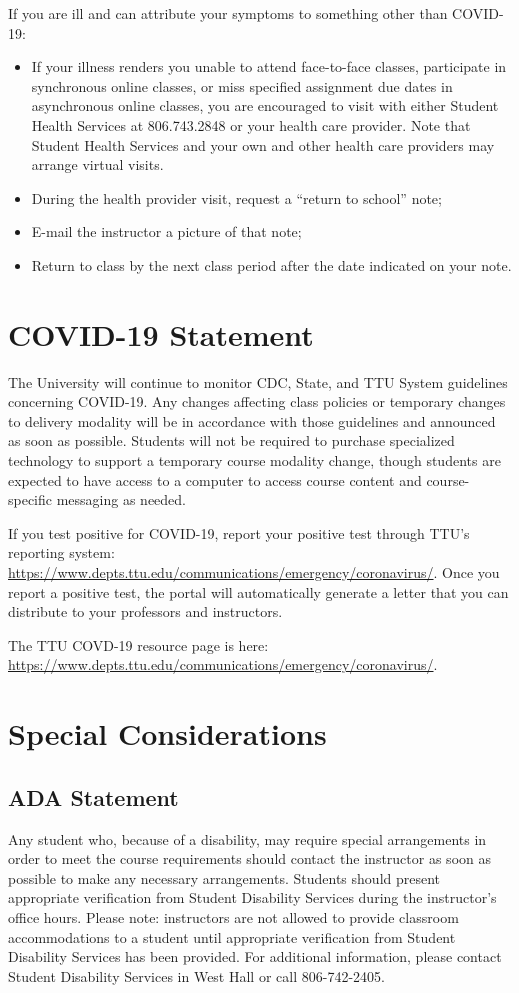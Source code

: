 \documentclass[12pt, notitlepage]{article}   	%
\begin{document}
{If you are ill and can attribute your symptoms to something other than COVID-19:
\begin{itemize}
	\item{If your illness renders you unable to attend face-to-face classes, participate 
	in synchronous online classes, or miss specified assignment due dates in asynchronous 
	online classes, you are encouraged to visit with either Student Health Services at 
	806.743.2848 or your health care provider.  Note that Student Health Services and 
	your own and other health care providers may arrange virtual visits.}
	\item{During the health provider visit, request a “return to school” note;}
	\item{E-mail the instructor a picture of that note;}
	\item{Return to class by the next class period after the date indicated on your note.}
\end{itemize}

\section{COVID-19 Statement}
The University will continue to monitor CDC, State, and TTU System guidelines concerning COVID-19. 
Any changes affecting class policies or temporary changes to delivery modality will be in 
accordance with those guidelines and announced as soon as possible. Students will not be 
required to purchase specialized technology to support a temporary course modality change, 
though students are expected to have access to a computer to access course content and 
course-specific messaging as needed. 

If you test positive for COVID-19, report your positive test through TTU's reporting system: 
\url{https://www.depts.ttu.edu/communications/emergency/coronavirus/}. Once you report a positive 
test, the portal will automatically generate a letter that you can distribute to your 
professors and instructors.

The TTU COVD-19 resource page is here: \url{https://www.depts.ttu.edu/communications/emergency/coronavirus/}.

\section{Special Considerations}
\subsection{ADA Statement}
Any student who, because of a disability, may require special arrangements in order to 
meet the course requirements should contact the instructor as soon as possible to make 
any necessary arrangements. Students should present appropriate verification from Student 
Disability Services during the instructor's office hours. Please note: instructors are 
not allowed to provide classroom accommodations to a student until appropriate verification 
from Student Disability Services has been provided. For additional information, please 
contact Student Disability Services in West Hall or call 806-742-2405.

}
\end{document}
